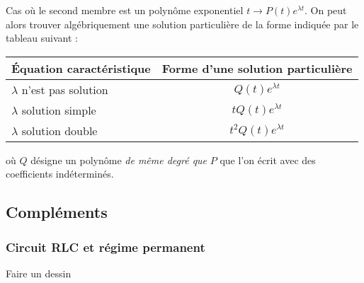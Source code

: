 Cas où le second membre est un polynôme exponentiel $t\rightarrow P(t)e^{\lambda t}$.\newline
On peut alors trouver algébriquement une solution particulière de la forme indiquée par le tableau suivant :
\begin{center}
\renewcommand{\arraystretch}{1.5}
\begin{tabular}{|l|c|} \hline
\'Equation caractéristique   & Forme d'une solution particulière \\ \hline
$\lambda$ n'est pas solution & $Q(t)e^{\lambda t}$               \\ \hline
$\lambda$ solution simple    & $tQ(t)e^{\lambda t}$              \\ \hline
$\lambda$ solution double    & $t^2Q(t)e^{\lambda t}$            \\ \hline
\end{tabular}
\end{center}
où $Q$ désigne un polynôme \emph{de même degré que } $P$ que l'on écrit avec des coefficients indéterminés.

\subsection{Compléments}
\subsubsection{Circuit RLC et régime permanent}
Faire un dessin

